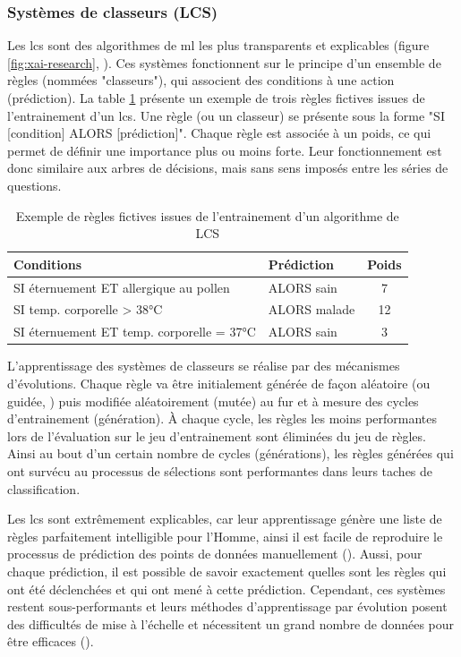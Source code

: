 \subsubsection{Systèmes de classeurs (LCS)}
Les \gls{lcs} sont des algorithmes de \gls{ml} les plus transparents et explicables (figure \ref{fig:xai-research}, \cite{arrieta_explainable_2019}). Ces systèmes fonctionnent sur le principe d'un ensemble de règles (nommées "classeurs"), qui associent des conditions à une action (prédiction). La table \ref{table:lcs-rules} présente un exemple de trois règles fictives issues de l'entrainement d'un \gls{lcs}. Une règle (ou un classeur) se présente sous la forme "SI [condition] ALORS [prédiction]". Chaque règle est associée à un poids, ce qui permet de définir une importance plus ou moins forte. Leur fonctionnement est donc similaire aux arbres de décisions, mais sans sens imposés entre les séries de questions.
\begin{table}[!htbp]
\centering
\begin{tabular}{|l|l|c|} 
 \hline
 Conditions & Prédiction & Poids \\
 \hline
 SI éternuement ET allergique au pollen & ALORS sain & 7 \\ 
 SI temp. corporelle > 38°C & ALORS malade & 12  \\ 
 SI éternuement ET temp. corporelle = 37°C & ALORS sain & 3  \\ 

 \hline
\end{tabular}
\caption{Exemple de règles fictives issues de l'entrainement d'un algorithme de LCS}
\label{table:lcs-rules}
\end{table}

L'apprentissage des systèmes de classeurs se réalise par des mécanismes d'évolutions. Chaque règle va être initialement générée de façon aléatoire (ou guidée, \cite{urbanowicz_relief-based_2018}) puis modifiée aléatoirement (mutée) au fur et à mesure des cycles d'entrainement (génération). À chaque cycle, les règles les moins performantes lors de l'évaluation sur le jeu d'entrainement sont éliminées du jeu de règles. Ainsi au bout d'un certain nombre de cycles (générations), les règles générées qui ont survécu au processus de sélections sont performantes dans leurs taches de classification.

Les \gls{lcs} sont extrêmement explicables, car leur apprentissage génère une liste de règles parfaitement intelligible pour l'Homme, ainsi il est facile de reproduire le processus de prédiction des points de données manuellement (\cite{arrieta_explainable_2019}). Aussi, pour chaque prédiction, il est possible de savoir exactement quelles sont les règles qui ont été déclenchées et qui ont mené à cette prédiction. Cependant, ces systèmes restent sous-performants et leurs méthodes d'apprentissage par évolution posent des difficultés de mise à l'échelle et nécessitent un grand nombre de données pour être efficaces (\cite{urbanowicz_exstracs_2015}).

